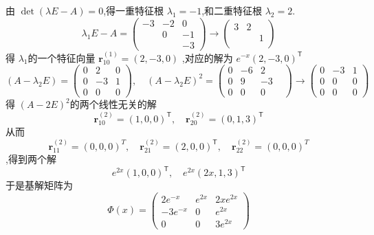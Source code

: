 \documentclass[lang=cn,12pt,color=green,fontset=none]{elegantbook}
\begin{document}
\begin{solution}
    由 $ \det \left(  \lambda E-A \right)  =0$,得一重特征根 $  \lambda _{1} = -1 $,和二重特征根 $  \lambda _{2} = 2 $.
     $$
      \lambda _{1}E-A = \begin{pmatrix} 
            -3 &-2& 0\\ 
             & 0& -1\\ 
              & & -3
      \end{pmatrix} \to \begin{pmatrix} 
            3 & 2 & \\ 
             & & 1\\ 
              & & 
      \end{pmatrix} 
     $$  得 $  \lambda _{1} $的一个特征向量 $ \mathbf{r}_{10}^{\left( 1 \right) } = \left( 2,-3,0 \right)  $ ,对应的解为 $ e^{-x}\left( 2,-3,0 \right)^{\mathsf{T}}  $  $$
     \left( A- \lambda _{2}E \right) = \begin{pmatrix} 
         0 & 2 & 0\\ 
          0& -3 & 1\\ 
           0& 0& 0
     \end{pmatrix}  ,\quad  \left( A- \lambda _{2}E \right)^{2} = \begin{pmatrix} 
         0 & -6& 2\\ 
          0& 9& -3\\ 
           0& 0& 0& 
     \end{pmatrix}  \to  \begin{pmatrix} 
         0& -3 & 1\\ 
          0& 0& 0\\ 
           0& 0& 0 
     \end{pmatrix} 
     $$ 得 $ \left( A-2E \right)^{2}  $的两个线性无关的解 $$
     \mathbf{r}_{10}^{\left( 2 \right) } =\left( 1,0,0 \right)^{\mathsf{T}},\quad  \mathbf{r}_{20}^{\left( 2 \right) } = \left( 0,1,3 \right)^{\mathsf{T}}  
     $$ 从而 $$
     \mathbf{r}_{11}^{\left( 2 \right) }=\left( 0,0,0 \right)^{T}, \quad  \mathbf{r}_{21}^{\left( 2 \right) } = \left( 2,0,0 \right)^{\mathsf{T}},\quad  \mathbf{r}_{22}^{\left( 2 \right) } = \left( 0,0,0 \right)^{T}   
     $$,得到两个解 $$
     e^{2x}\left( 1,0,0 \right)^{\mathsf{T}},\quad  e^{2x} \left( 2x,1,3 \right) ^{\mathsf{T}}
     $$于是基解矩阵为 $$
     \Phi \left( x \right) = \begin{pmatrix} 
           2e^{-x} & e^{2x}& 2xe^{2x}\\ 
            -3e^{-x}& 0 & e^{2x}\\ 
             0 & 0 & 3e^{2x}
     \end{pmatrix}  
     $$
\end{solution}
\end{document}

